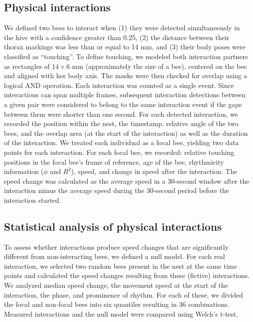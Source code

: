 \documentclass{article}
\begin{document}
\subsection*{Physical interactions}
We defined two bees to interact when (1) they were detected simultaneously in the hive with a confidence greater than 0.25, (2) the distance between their thorax markings was less than or equal to 14 mm, and (3) their body poses were classified as “touching”. To define touching, we modeled both interaction partners as rectangles of $14 \times 6$ mm (approximately the size of a bee), centered on the bee and aligned with her body axis. The masks were then checked for overlap using a logical AND operation. Each interaction was counted as a single event. Since interactions can span multiple frames, subsequent interaction detections between a given pair were considered to belong to the same interaction event if the gaps between them were shorter than one second. For each detected interaction, we recorded the position within the nest, the timestamp, relative angle of the two bees, and the overlap area (at the start of the interaction) as well as the duration of the interaction. We treated each individual as a focal bee, yielding two data points for each interaction. For each focal bee, we recorded: relative touching positions in the focal bee’s frame of reference, age of the bee, rhythmicity information ($\phi$ and $R^2$), speed, and change in speed after the interaction. The speed change was calculated as the average speed in a 30-second window after the interaction minus the average speed during the 30-second period before the interaction started.

\subsection*{Statistical analysis of physical interactions}
To assess whether interactions produce speed changes that are significantly different from non-interacting bees, we defined a null model. For each real interaction, we selected two random bees present in the nest at the same time points and calculated the speed changes resulting from these (fictive) interactions. We analyzed median speed change, the movement speed at the start of the interaction, the phase, and prominence of rhythm. For each of these, we divided the focal and non-focal bees into six quantiles resulting in 36 combinations. Measured interactions and the null model were compared using Welch’s t-test.
\end{document}
